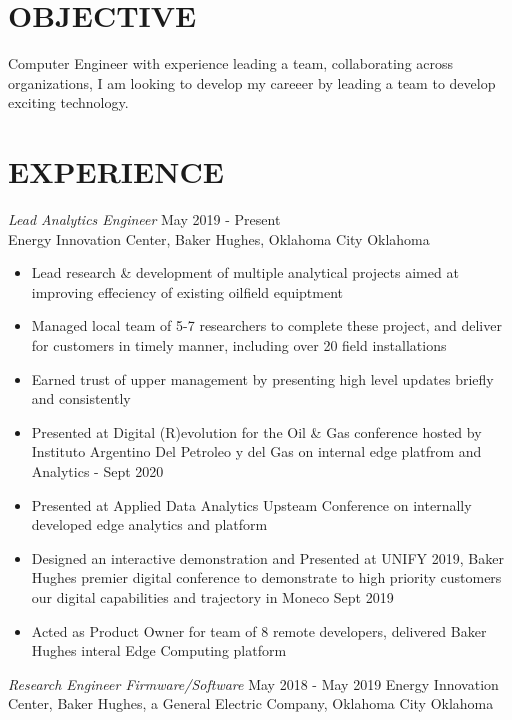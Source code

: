 \documentclass[line,margin]{res}
\begin{document}
\address{sammgtanner@gmail.com}
\address{(208) 830-1983}


\begin{resume}

	\section{OBJECTIVE}
	Computer Engineer with experience leading a team, collaborating across organizations, I am looking to develop my careeer by leading a team to develop exciting technology.

	\section{EXPERIENCE}
	 {\sl Lead Analytics Engineer} \hfill May 2019 - Present \\
	Energy Innovation Center, Baker Hughes, Oklahoma City Oklahoma
	\begin{itemize} \itemsep -2pt
		\item Lead research \& development of multiple analytical projects aimed at improving effeciency of existing oilfield equiptment
		\item Managed local team of 5-7 researchers to complete these project, and deliver for customers in timely manner, including over 20 field installations
		\item Earned trust of upper management by presenting high level updates briefly and consistently
		\item Presented at Digital (R)evolution for the Oil \& Gas conference hosted by Instituto Argentino Del Petroleo y del Gas on internal edge platfrom and Analytics - Sept 2020
		\item Presented at Applied Data Analytics Upsteam Conference on internally developed edge analytics and platform
		\item Designed an interactive demonstration and Presented at UNIFY 2019, Baker Hughes premier digital conference to demonstrate to high priority customers our digital capabilities and trajectory in Moneco Sept 2019
		\item Acted as Product Owner for team of 8 remote developers, delivered Baker Hughes interal Edge Computing platform
	\end{itemize}
	{\sl Research Engineer Firmware/Software} \hfill May 2018 - May 2019
	Energy Innovation Center, Baker Hughes, a General Electric Company, Oklahoma City Oklahoma
	\begin{itemize} \itemsep -2pt

\end{itemize}
\end{resume}
\end{document}
